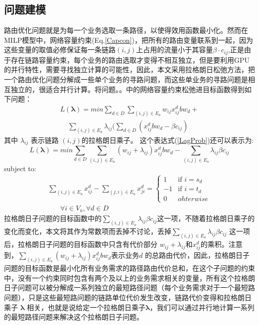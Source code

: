 \subsection{问题建模}
  路由优化问题就是为每一个业务选取一条路径，以使得效用函数最小化。然而在MILP模型中，网络容量约束(Eq.\ref{Capcon})，把所有的路由变量联系到一起，因为这些变量的取值必修保证每一条链路$(i,j)$上占用的流量小于其容量$\beta\cdot c_{ij}$,正是由于存在链路容量约束，每个业务的路由选取才变得不相互独立，但是要利用GPU 的并行特性，需要寻找独立计算的可能性，因此，本文采用拉格朗日松弛方法，把一个路由优化问题分解成一些单个业务的寻路问题，而这些单业务的寻路问题是相互独立的，很适合并行计算。将问题。。中的网络容量约束松弛进目标函数得到如下问题：
\begin{equation}\label{LagProb}
\begin{split}
L(\mathbf{\lambda})= min\sum\limits_{d \in D}\sum\limits_{(i,j) \in E_a} w_{ij}x_{ij}^d bw_d+ \\ ~~~~~\sum\limits_{(i,j) \in E_a}\lambda_{ij}(\sum\limits_{d \in D} (x_{ij}^d bw_d-\beta c_{ij})
\end{split}
\end{equation}
其中 $\lambda_{ij}$ 表示链路 $(i,j)$的拉格朗日乘子。
这个表达式(\ref{LagProb})还可以表示为:
\begin{equation}\label{Lagprob1}
L(\mathbf{\lambda})= min\sum\limits_{d \in D}\sum\limits_{(i,j) \in E_a} (w_{ij}+\lambda_{ij})x_{ij}^dbw_d -\sum\limits_{(i,j) \in E_a}\lambda_{ij}\beta c_{ij}
\end{equation}
subject to:
\begin{equation}\label{FlowConv2}
\begin{split}
\sum\limits_{(i,j) \in E_a} x_{ij}^d - \sum\limits_{(j,i) \in E_a} x_{ji}^d
=\begin{cases}
1 & \text{if $i = s_d$}\\
-1 & \text{if $i = t_d$} \\
0 &{ohterwise}
\end{cases}
\\~~~~~~~~\forall i\in V_a, \forall d\in D
\end{split}
\end{equation}
 拉格朗日子问题的目标函数中的$\sum_{(i,j) \in E_a}\lambda_{ij}\beta c_{ij}$这一项，不随着拉格朗日乘子的变化而变化，本文将其作为常数项而丢掉不讨论，丢掉$\sum_{(i,j) \in E_a}\lambda_{ij}\beta c_{ij}$ 这一项后，拉格朗日子问题的目标函数中只含有代价部分 $w_{ij}+\lambda_{ij}$和$x_{ij}^d$的乘积。注意到，$\sum_{(i,j) \in E_a} (w_{ij}+\lambda_{ij})x_{ij}^d bw_d$表示业务$d$ 的总路由代价，因此，拉格朗日子问题的目标函数是最小化所有业务需求的路径路由代价总和，在这个子问题的约束中，没有一个约束同时包含有两个及以上的业务需求相关的变量，所有这个拉格朗日子问题可以被分解成一系列独立的最短路径问题（每个业务需求对于一个最短路问题），只是这些最短路问题的链路单位代价发生改变，链路代价变得和拉格朗日乘子 $\mathbf{\lambda}$ 相关，也就是说给定一个拉格朗日乘子$\mathbf{\lambda}$，我们可以通过并行地计算一系列的最短路径问题来解决这个拉格朗日子问题。
